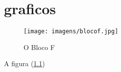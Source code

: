 

\chapter{graficos}
\label{cap:graf}


\begin{figure}[h]
	\texttt{[image: imagens/blocof.jpg]}
	\caption{O Bloco F}
	\label{fig:blocof} %
\end{figure}
A figura (\ref{fig:blocof})

\lipsum[35-36]